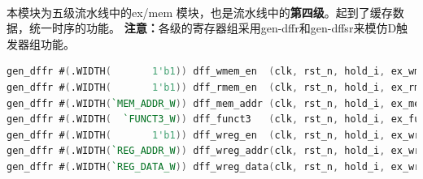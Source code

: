 \documentclass[lang=cn,11pt,a4paper]{elegantpaper}
\begin{document}
\\
本模块为五级流水线中的ex/mem 模块，也是流水线中的\textbf{第四级}。起到了缓存数据，统一时序的功能。
\textbf{注意：}各级的寄存器组采用gen-dffr和gen-dffsr来模仿D触发器组功能。
\begin{lstlisting}[language=verilog]
gen_dffr #(.WIDTH(       1'b1)) dff_wmem_en  (clk, rst_n, hold_i, ex_wmem_en_i, mem_wmem_en_o);
gen_dffr #(.WIDTH(       1'b1)) dff_rmem_en  (clk, rst_n, hold_i, ex_rmem_en_i, mem_rmem_en_o);
gen_dffr #(.WIDTH(`MEM_ADDR_W)) dff_mem_addr (clk, rst_n, hold_i, ex_mem_addr_i, mem_mem_addr_o);
gen_dffr #(.WIDTH(  `FUNCT3_W)) dff_funct3   (clk, rst_n, hold_i, ex_funct3_i, mem_funct3_o);
gen_dffr #(.WIDTH(       1'b1)) dff_wreg_en  (clk, rst_n, hold_i, ex_wreg_en_i, mem_wreg_en_o);
gen_dffr #(.WIDTH(`REG_ADDR_W)) dff_wreg_addr(clk, rst_n, hold_i, ex_wreg_addr_i, mem_wreg_addr_o);
gen_dffr #(.WIDTH(`REG_DATA_W)) dff_wreg_data(clk, rst_n, hold_i, ex_wreg_data_i, mem_wreg_data_o);
\end{lstlisting}
\end{document}
